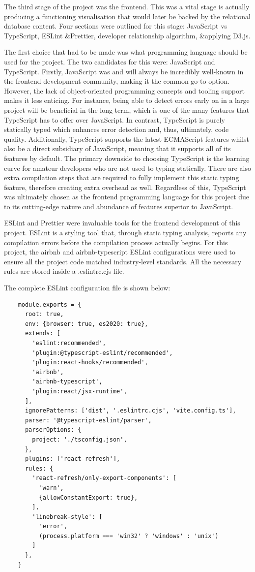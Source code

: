 The third stage of the project was the frontend.
This was a vital stage is actually producing a functioning visualisation
that would later be backed by the relational database content.
Four sections were outlined for this stage: JavaScript vs TypeScript,
ESLint \&Prettier, developer relationship algorithm, \&applying D3.js.

The first choice that had to be made was what programming language should be used for the project.
The two candidates for this were: JavaScript and TypeScript.
Firstly, JavaScript was and will always be incredibly well-known in the frontend development community,
making it the common go-to option.
However, the lack of object-oriented programming concepts and tooling support makes it less enticing.
For instance, being able to detect errors early on in a large project will be beneficial in the long-term,
which is one of the many features that TypeScript has to offer over JavaScript.
In contrast, TypeScript is purely statically typed which enhances error detection and, thus, ultimately, code quality.
Additionally, TypeScript supports the latest ECMAScript features whilst also be a direct subsidiary of JavaScript,
meaning that it supports all of its features by default.
The primary downside to choosing TypeScript is the learning curve for amateur developers
who are not used to typing statically.
There are also extra compilation steps that are required to fully implement this static typing feature,
therefore creating extra overhead as well.
Regardless of this,
TypeScript was ultimately chosen as the frontend programming language for this project due to its cutting-edge nature and abundance of features superior to JavaScript.

ESLint and Prettier were invaluable tools for the frontend development of this project.
ESLint is a styling tool that, through static typing analysis,
reports any compilation errors before the compilation process actually begins.
For this project,
the airbnb and airbnb-typescript ESLint configurations were used
to ensure all the project code matched industry-level standards.
All the necessary rules are stored inside a .eslintrc.cjs file.

The complete ESLint configuration file is shown below:

\begin{verbatim}
    module.exports = {
      root: true,
      env: {browser: true, es2020: true},
      extends: [
        'eslint:recommended',
        'plugin:@typescript-eslint/recommended',
        'plugin:react-hooks/recommended',
        'airbnb',
        'airbnb-typescript',
        'plugin:react/jsx-runtime',
      ],
      ignorePatterns: ['dist', '.eslintrc.cjs', 'vite.config.ts'],
      parser: '@typescript-eslint/parser',
      parserOptions: {
        project: './tsconfig.json',
      },
      plugins: ['react-refresh'],
      rules: {
        'react-refresh/only-export-components': [
          'warn',
          {allowConstantExport: true},
        ],
        'linebreak-style': [
          'error',
          (process.platform === 'win32' ? 'windows' : 'unix')
        ]
      },
    }
\end{verbatim}

